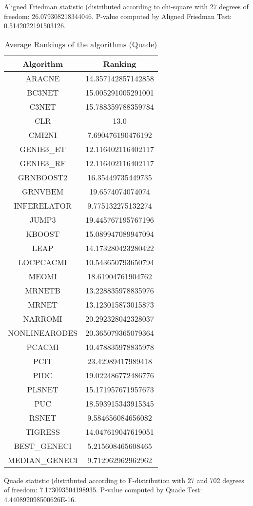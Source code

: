 \documentclass[a4paper,10pt]{article}
\begin{document}
\begin{landscape}
Aligned Friedman statistic (distributed according to chi-square with 27 degrees of freedom: 26.079308218344046. 
P-value computed by Aligned Friedman Test: 0.5142022191503126.\newline


\newpage

\begin{table}[!htp]
\centering
\caption{Average Rankings of the algorithms (Quade)
}\begin{tabular}{c|c}
Algorithm&Ranking\\
\hline
ARACNE&14.357142857142858\\
BC3NET&15.005291005291001\\
C3NET&15.788359788359784\\
CLR&13.0\\
CMI2NI&7.690476190476192\\
GENIE3_ET&12.116402116402117\\
GENIE3_RF&12.116402116402117\\
GRNBOOST2&16.35449735449735\\
GRNVBEM&19.6574074074074\\
INFERELATOR&9.775132275132274\\
JUMP3&19.445767195767196\\
KBOOST&15.089947089947094\\
LEAP&14.173280423280422\\
LOCPCACMI&10.543650793650794\\
MEOMI&18.61904761904762\\
MRNETB&13.228835978835976\\
MRNET&13.123015873015873\\
NARROMI&20.292328042328037\\
NONLINEARODES&20.365079365079364\\
PCACMI&10.478835978835978\\
PCIT&23.42989417989418\\
PIDC&19.022486772486776\\
PLSNET&15.171957671957673\\
PUC&18.593915343915345\\
RSNET&9.584656084656082\\
TIGRESS&14.047619047619051\\
BEST_GENECI&5.215608465608465\\
MEDIAN_GENECI&9.712962962962962\\
\end{tabular}
\end{table}
Quade statistic (distributed according to F-distribution with 27 and 702 degrees of freedom: 7.173093504198935. 
P-value computed by Quade Test: 4.440892098500626E-16.\newline



\end{landscape}
\end{document}
